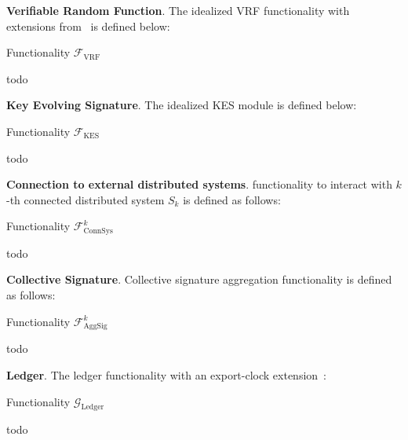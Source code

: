 \bigbreak
\bigbreak
\noindent
{}
\textbf{Veriﬁable Random Function}.\label{apndx:vrf}
The idealized VRF functionality with extensions from~\cite{cryptoeprint:2022/1045} is defined below:
\begin{functionality}
    \caption{Functionality $\mathcal{F}_{\text{VRF}}$}
    \begin{algorithmic}[1]

        todo
    \end{algorithmic}\label{alg:vrf}
\end{functionality}

\bigbreak
\bigbreak
\noindent
{}
\textbf{Key Evolving Signature}.\label{apndx:kes}
The idealized KES module is defined below:
\begin{functionality}
    \caption{Functionality $\mathcal{F}_{\text{KES}}$}
    \begin{algorithmic}[1]

        todo
    \end{algorithmic}\label{alg:kes}
\end{functionality}


\bigbreak
\bigbreak
\noindent
{}
\textbf{Connection to external distributed systems}.\label{apndx:conn}
functionality to interact with $k$-th connected distributed system $S_k$ is defined as follows:
\begin{functionality}
    \caption{Functionality $\mathcal{F}^k_{\text{ConnSys}}$}
    \begin{algorithmic}[1]

        todo
    \end{algorithmic}\label{alg:conn}
\end{functionality}

\bigbreak
\bigbreak
\noindent
{}
\textbf{Collective Signature}.\label{apndx:agg-sig}
Collective signature aggregation functionality is defined as follows:
\begin{functionality}
    \caption{Functionality $\mathcal{F}^k_{\text{AggSig}}$}
    \begin{algorithmic}[1]

        todo
    \end{algorithmic}\label{alg:agg-sig}
\end{functionality}


\bigbreak
\bigbreak
\noindent
{}
\textbf{Ledger}.\label{apndx:ledger}
The ledger functionality with an export-clock extension~\cite{cryptoeprint:2019/838}:
\begin{functionality}
    \caption{Functionality $\mathcal{G}_{\text{Ledger}}$}
    \begin{algorithmic}[1]

        todo
    \end{algorithmic}\label{alg:ledger}
\end{functionality}